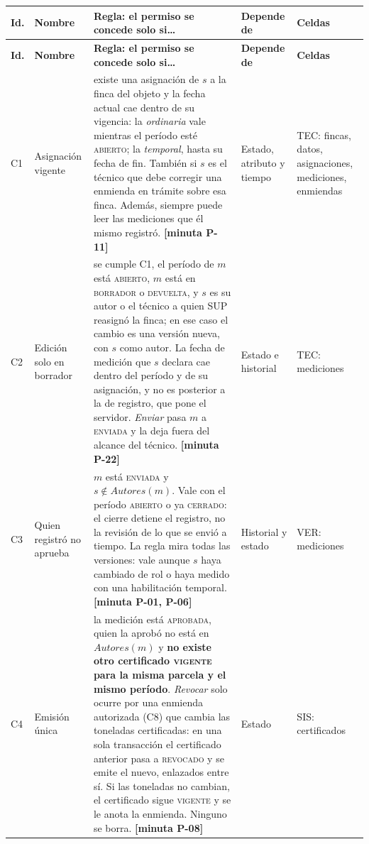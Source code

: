 \documentclass[11pt,letterpaper]{article}
\newcommand{\cab}[1]{\textbf{\rmfamily #1}}
\newcommand{\resp}[1]{\textrm{\footnotesize\bfseries [minuta #1]}}
\newcommand{\est}[1]{\textsc{\small #1}}
\begin{document}
{\small
\renewcommand{\arraystretch}{1.25}
\begin{longtable}{@{}L{0.8cm} L{2.5cm} L{8.0cm} L{1.7cm} L{1.95cm}@{}}
\toprule
\cab{Id.} & \cab{Nombre} & \cab{Regla: el permiso se concede solo si\ldots} & \cab{Depende de} & \cab{Celdas} \\
\midrule
\endfirsthead
\toprule
\cab{Id.} & \cab{Nombre} & \cab{Regla: el permiso se concede solo si\ldots} & \cab{Depende de} & \cab{Celdas} \\
\midrule
\endhead
\bottomrule
\endfoot

C1 & Asignación vigente &
existe una asignación de $s$ a la finca del objeto y la fecha actual cae dentro de su vigencia: la
\emph{ordinaria} vale mientras el período esté \est{abierto}; la \emph{temporal}, hasta su fecha de fin.
También si $s$ es el técnico que debe corregir una enmienda en trámite sobre esa finca. Además,
siempre puede leer las mediciones que él mismo registró. \resp{P-11} &
Estado, atributo y tiempo &
TEC: fincas, datos, asignaciones, mediciones, enmiendas \\

C2 & Edición solo en borrador &
se cumple C1, el período de $m$ está \est{abierto}, $m$ está en \est{borrador} o \est{devuelta}, y
$s$ es su autor o el técnico a quien SUP reasignó la finca; en ese caso el cambio es una versión
nueva, con $s$ como autor. La fecha de medición que $s$ declara cae dentro del período y de su
asignación, y no es posterior a la de registro, que pone el servidor. \emph{Enviar} pasa $m$ a
\est{enviada} y la deja fuera del alcance del técnico. \resp{P-22} &
Estado e historial &
TEC: mediciones \\

C3 & Quien registró no aprueba &
$m$ está \est{enviada} y $s \notin \mathit{Autores}(m)$. Vale con el período \est{abierto} o ya
\est{cerrado}: el cierre detiene el registro, no la revisión de lo que se envió a tiempo. La regla
mira todas las versiones: vale aunque $s$ haya cambiado de rol o haya medido con una habilitación
temporal. \resp{P-01, P-06} &
Historial y estado &
VER: mediciones \\

C4 & Emisión única &
la medición está \est{aprobada}, quien la aprobó no está en $\mathit{Autores}(m)$ y \textbf{no existe otro
certificado \est{vigente} para la misma parcela y el mismo período}. \emph{Revocar} solo ocurre por
una enmienda autorizada (C8) que cambia las toneladas certificadas: en una sola transacción el
certificado anterior pasa a \est{revocado} y se emite el nuevo, enlazados entre sí. Si las toneladas
no cambian, el certificado sigue \est{vigente} y se le anota la enmienda. Ninguno se borra. \resp{P-08} &
Estado &
SIS: certificados \\


\end{longtable}}
\end{document}
